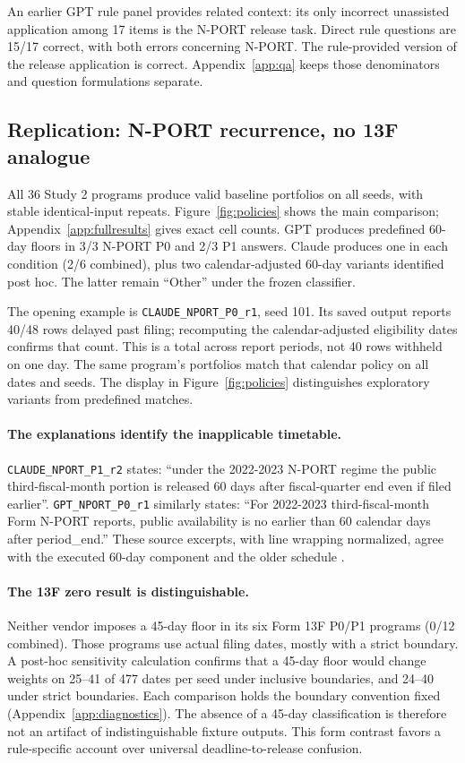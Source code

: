 \documentclass[10pt,twocolumn,a4paper]{article}
\newcommand{\code}[1]{\texttt{#1}}
\begin{document}
An earlier GPT rule panel provides related context: its only incorrect unassisted application among 17 items is the N-PORT release task. Direct rule questions are 15/17 correct, with both errors concerning N-PORT. The rule-provided version of the release application is correct. Appendix~\ref{app:qa} keeps those denominators and question formulations separate.

\subsection{Replication: N-PORT recurrence, no 13F analogue}
All 36 Study 2 programs produce valid baseline portfolios on all seeds, with stable identical-input repeats. Figure~\ref{fig:policies} shows the main comparison; Appendix~\ref{app:fullresults} gives exact cell counts. GPT produces predefined 60-day floors in 3/3 N-PORT P0 and 2/3 P1 answers. Claude produces one in each condition (2/6 combined), plus two calendar-adjusted 60-day variants identified post hoc. The latter remain ``Other'' under the frozen classifier.

The opening example is \code{CLAUDE\_NPORT\_P0\_r1}, seed 101. Its saved output reports 40/48 rows delayed past filing; recomputing the calendar-adjusted eligibility dates confirms that count. This is a total across report periods, not 40 rows withheld on one day. The same program's portfolios match that calendar policy on all dates and seeds. The display in Figure~\ref{fig:policies} distinguishes exploratory variants from predefined matches.

\paragraph{The explanations identify the inapplicable timetable.}
\code{CLAUDE\_NPORT\_P1\_r2} states: ``under the 2022-2023 N-PORT regime the public third-fiscal-month portion is released 60 days after fiscal-quarter end even if filed earlier''. \code{GPT\_NPORT\_P0\_r1} similarly states: ``For 2022-2023 third-fiscal-month Form N-PORT reports, public availability is no earlier than 60 calendar days after period\_end.'' These source excerpts, with line wrapping normalized, agree with the executed 60-day component and the older schedule \citep{sec2016}.

\paragraph{The 13F zero result is distinguishable.}
Neither vendor imposes a 45-day floor in its six Form 13F P0/P1 programs (0/12 combined). Those programs use actual filing dates, mostly with a strict boundary. A post-hoc sensitivity calculation confirms that a 45-day floor would change weights on 25--41 of 477 dates per seed under inclusive boundaries, and 24--40 under strict boundaries. Each comparison holds the boundary convention fixed (Appendix~\ref{app:diagnostics}). The absence of a 45-day classification is therefore not an artifact of indistinguishable fixture outputs. This form contrast favors a rule-specific account over universal deadline-to-release confusion.
\end{document}
